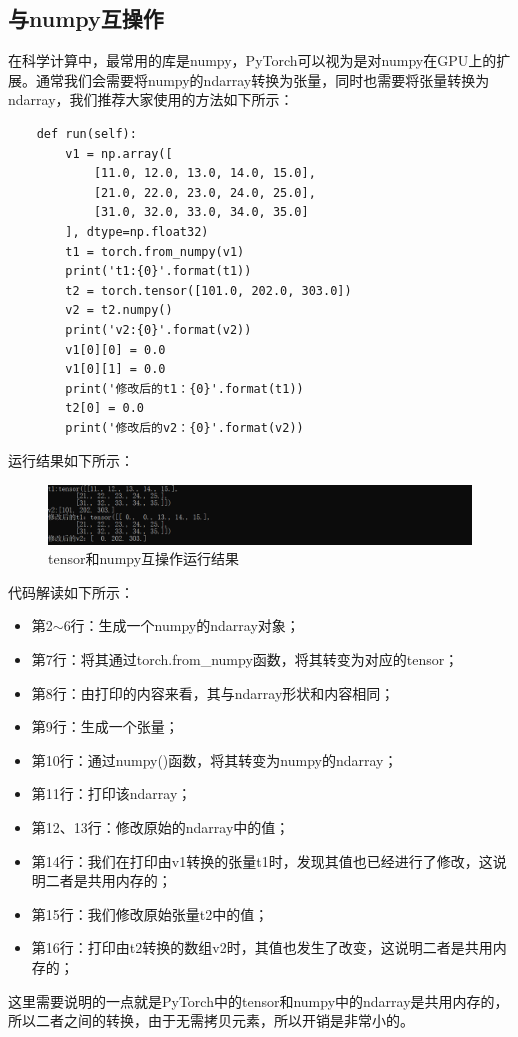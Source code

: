 \documentclass[UTF8]{article}
\begin{document}
\subsection{与numpy互操作}
在科学计算中，最常用的库是numpy，PyTorch可以视为是对numpy在GPU上的扩展。通常我们会需要将numpy的ndarray转换为张量，同时也需要将张量转换为ndarray，我们推荐大家使用的方法如下所示：
\begin{lstlisting}
    def run(self):
        v1 = np.array([
            [11.0, 12.0, 13.0, 14.0, 15.0],
            [21.0, 22.0, 23.0, 24.0, 25.0],
            [31.0, 32.0, 33.0, 34.0, 35.0]
        ], dtype=np.float32)
        t1 = torch.from_numpy(v1)
        print('t1:{0}'.format(t1))
        t2 = torch.tensor([101.0, 202.0, 303.0])
        v2 = t2.numpy()
        print('v2:{0}'.format(v2))
        v1[0][0] = 0.0
        v1[0][1] = 0.0
        print('修改后的t1：{0}'.format(t1))
        t2[0] = 0.0
        print('修改后的v2：{0}'.format(v2))
\end{lstlisting}
运行结果如下所示：
\begin{figure}[H]
	\caption{tensor和numpy互操作运行结果}
	\label{f000004}
	\centering
	\includegraphics[width=15cm]{images/f000004}
\end{figure}
代码解读如下所示：
\begin{itemize}
\item 第2$\sim$6行：生成一个numpy的ndarray对象；
\item 第7行：将其通过torch.from\_numpy函数，将其转变为对应的tensor；
\item 第8行：由打印的内容来看，其与ndarray形状和内容相同；
\item 第9行：生成一个张量；
\item 第10行：通过numpy()函数，将其转变为numpy的ndarray；
\item 第11行：打印该ndarray；
\item 第12、13行：修改原始的ndarray中的值；
\item 第14行：我们在打印由v1转换的张量t1时，发现其值也已经进行了修改，这说明二者是共用内存的；
\item 第15行：我们修改原始张量t2中的值；
\item 第16行：打印由t2转换的数组v2时，其值也发生了改变，这说明二者是共用内存的；
\end{itemize}
这里需要说明的一点就是PyTorch中的tensor和numpy中的ndarray是共用内存的，所以二者之间的转换，由于无需拷贝元素，所以开销是非常小的。
\end{document}
